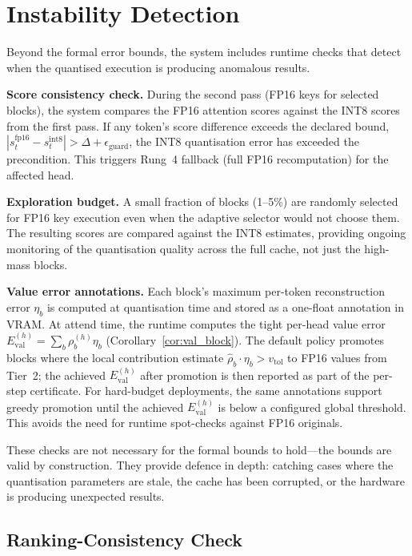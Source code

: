 \documentclass[11pt,a4paper]{article}
\theoremstyle{definition}
\theoremstyle{remark}
\begin{document}
\section{Instability Detection}
\label{sec:instability}

Beyond the formal error bounds, the system includes runtime checks that detect when the quantised execution is producing anomalous results.

\textbf{Score consistency check.}  During the second pass (FP16 keys for selected blocks), the system compares the FP16 attention scores against the INT8 scores from the first pass.  If any token's score difference exceeds the declared bound, $|s_t^{\mathrm{fp16}} - s_t^{\mathrm{int8}}| > \Delta + \epsilon_{\mathrm{guard}}$, the INT8 quantisation error has exceeded the precondition.  This triggers Rung~4 fallback (full FP16 recomputation) for the affected head.

\textbf{Exploration budget.}  A small fraction of blocks (1--5\%) are randomly selected for FP16 key execution even when the adaptive selector would not choose them.  The resulting scores are compared against the INT8 estimates, providing ongoing monitoring of the quantisation quality across the full cache, not just the high-mass blocks.

\textbf{Value error annotations.}  Each block's maximum per-token reconstruction error $\eta_b$ is computed at quantisation time and stored as a one-float annotation in VRAM\@.  At attend time, the runtime computes the tight per-head value error $E_{\mathrm{val}}^{(h)} = \sum_b \rho_b^{(h)} \eta_b$ (Corollary~\ref{cor:val_block}).  The default policy promotes blocks where the local contribution estimate $\hat{\rho}_b \cdot \eta_b > v_{\mathrm{tol}}$ to FP16 values from Tier~2; the achieved $E_{\mathrm{val}}^{(h)}$ after promotion is then reported as part of the per-step certificate.  For hard-budget deployments, the same annotations support greedy promotion until the achieved $E_{\mathrm{val}}^{(h)}$ is below a configured global threshold.  This avoids the need for runtime spot-checks against FP16 originals.

These checks are not necessary for the formal bounds to hold---the bounds are valid by construction.  They provide defence in depth: catching cases where the quantisation parameters are stale, the cache has been corrupted, or the hardware is producing unexpected results.

\subsection{Ranking-Consistency Check}
\label{sec:ranking_consistency}
\end{document}
